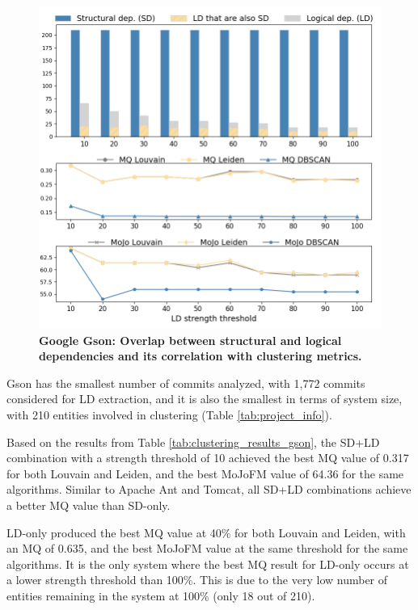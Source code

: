 \documentclass{ieeeaccess}
\begin{document}
\begin{figure}[t!]
  \centering
  \includegraphics[width=\columnwidth]{gson_correlation.png}
  \caption{\textbf{Google Gson: Overlap between structural and logical dependencies and its correlation with clustering metrics.}}
  \label{fig:gson_correlation}
\end{figure}

Gson has the smallest number of commits analyzed, with 1,772 commits considered for LD extraction, and it is also the smallest in terms of system size, with 210 entities involved in clustering (Table \ref{tab:project_info}).

Based on the results from Table \ref{tab:clustering_results_gson}, the SD+LD combination with a strength threshold of 10 achieved the best MQ value of 0.317 for both Louvain and Leiden, and the best MoJoFM value of 64.36 for the same algorithms. Similar to Apache Ant and Tomcat, all SD+LD combinations achieve a better MQ value than SD-only.

LD-only produced the best MQ value at 40\% for both Louvain and Leiden, with an MQ of 0.635, and the best MoJoFM value at the same threshold for the same algorithms. It is the only system where the best MQ result for LD-only occurs at a lower strength threshold than 100\%. This is due to the very low number of entities remaining in the system at 100\% (only 18 out of 210).
\end{document}

